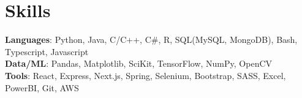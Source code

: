 \section{Skills}
 \begin{itemize}[leftmargin=0.15in, label={}]
    \small{\item{
     \textbf{Languages}{: Python, Java, C/C++, C\#, R, SQL(MySQL, MongoDB), Bash, Typescript, Javascript} \\
     \textbf{Data/ML}{: Pandas, Matplotlib, SciKit, TensorFlow, NumPy, OpenCV} \\
     \textbf{Tools}{: React, Express, Next.js, Spring, Selenium, Bootstrap, SASS, Excel, PowerBI, Git, AWS} \\
     
    }}
 \end{itemize}
